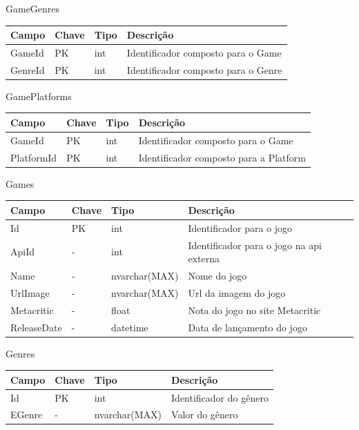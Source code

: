 \begin{apendicesenv}
\begin{quadro}[h!]
\centering
\caption{GameGenres}
\label{tab:gamegenres}
\begin{longtable}{|p{4cm}|p{2cm}|p{3cm}|p{5cm}|}
\hline
Campo & Chave & Tipo & Descrição
\\\hline
GameId & PK & int & Identificador composto para o Game
\\\hline
GenreId & PK & int & Identificador composto para o Genre
\\\hline
\end{longtable}
\end{quadro}

\begin{quadro}[h!]
\centering
\caption{GamePlatforms}
\label{tab:gameplatforms}
\begin{longtable}{|p{4cm}|p{2cm}|p{3cm}|p{5cm}|}
\hline
Campo & Chave & Tipo & Descrição
\\\hline
GameId & PK & int & Identificador composto para o Game
\\\hline
PlatformId & PK & int & Identificador composto para a Platform
\\\hline
\end{longtable}
\end{quadro}

\begin{quadro}[h!]
\centering
\caption{Games}
\label{tab:games}
\begin{longtable}{|p{4cm}|p{2cm}|p{3cm}|p{5cm}|}
\hline
Campo & Chave & Tipo & Descrição
\\\hline
Id & PK & int & Identificador para o jogo
\\\hline
ApiId & - & int & Identificador para o jogo na api externa
\\\hline
Name & - & nvarchar(MAX) & Nome do jogo
\\\hline
UrlImage & - & nvarchar(MAX) & Url da imagem do jogo
\\\hline
Metacritic & - & float & Nota do jogo no site Metacritic
\\\hline
ReleaseDate & - & datetime & Data de lançamento do jogo
\\\hline
\end{longtable}
\end{quadro}

\begin{quadro}[h!]
\centering
\caption{Genres}
\label{tab:genres}
\begin{longtable}{|p{4cm}|p{2cm}|p{3cm}|p{5cm}|}
\hline
Campo & Chave & Tipo & Descrição
\\\hline
Id & PK & int & Identificador do gênero
\\\hline
EGenre & - & nvarchar(MAX) & Valor do gênero
\\\hline
\end{longtable}
\end{quadro}


\end{apendicesenv}
